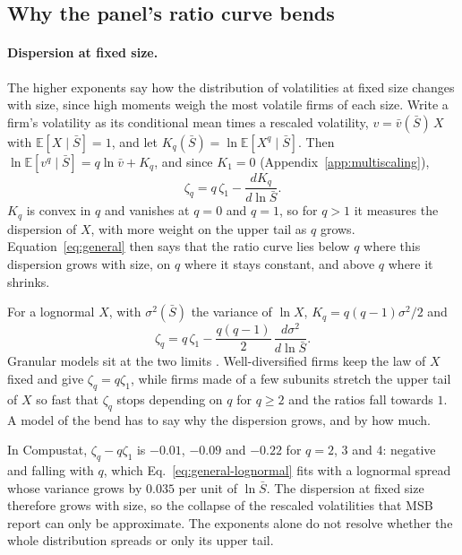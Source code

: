 \documentclass[pre,twocolumn,superscriptaddress,nofootinbib]{revtex4-2}
\newcommand{\E}{\mathbb E}
\newcommand{\Sb}{\bar S}
\begin{document}
\subsection{Why the panel's ratio curve bends}
\label{sec:criterion}

\paragraph{Dispersion at fixed size.}  The higher exponents say how the distribution of volatilities at fixed
size changes with size, since high moments weigh the most volatile firms of each size.  Write a firm's volatility as
its conditional mean times a rescaled volatility, $v=\bar v(\Sb)\,X$ with $\E[X\mid\Sb]=1$, and let
$K_q(\Sb)=\ln\E[X^q\mid\Sb]$.  Then $\ln\E[v^q\mid\Sb]=q\ln\bar v+K_q$, and since $K_1=0$
(Appendix~\ref{app:multiscaling}),
\begin{equation}
\zeta_q=q\,\zeta_1-\frac{dK_q}{d\ln\Sb}.
\label{eq:general}
\end{equation}
$K_q$ is convex in $q$ and vanishes at $q=0$ and $q=1$, so for $q>1$ it measures the dispersion of $X$, with more
weight on the upper tail as $q$ grows.  Equation~\eqref{eq:general} then says that the ratio curve lies below $q$
where this dispersion grows with size, on $q$ where it stays constant, and above $q$ where it shrinks.

For a lognormal $X$, with $\sigma^2(\Sb)$ the variance of $\ln X$, $K_q=q(q-1)\sigma^2/2$ and
\begin{equation}
\zeta_q=q\,\zeta_1-\frac{q(q-1)}{2}\,\frac{d\sigma^2}{d\ln\Sb}.
\label{eq:general-lognormal}
\end{equation}
Granular models sit at the two limits \cite{moran2024}.  Well-diversified firms keep the law of $X$ fixed and give
$\zeta_q=q\zeta_1$, while firms made of a few subunits stretch the upper tail of $X$ so fast that $\zeta_q$ stops
depending on $q$ for $q\ge2$ and the ratios fall towards $1$.  A model of the bend has to say why the dispersion
grows, and by how much.

In Compustat, $\zeta_q-q\zeta_1$ is $-0.01$, $-0.09$ and $-0.22$ for $q=2$, $3$ and $4$: negative and falling with
$q$, which Eq.~\eqref{eq:general-lognormal} fits with a lognormal spread whose variance grows by $0.035$ per unit
of $\ln\Sb$.  The dispersion at fixed size therefore grows with size, so the collapse of the rescaled volatilities
that MSB report can only be approximate.  The exponents alone do not resolve whether the whole distribution
spreads or only its upper tail.
\end{document}
